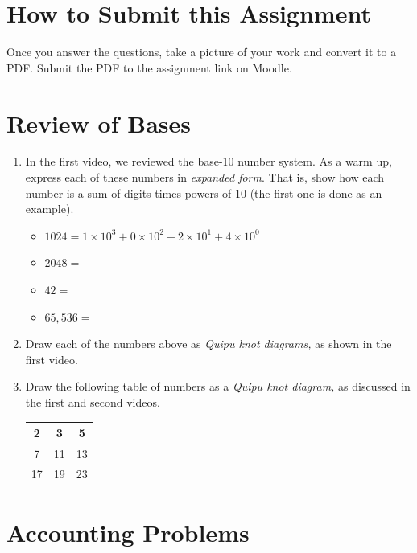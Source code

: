 \documentclass[10pt]{article}
\begin{document}
\maketitle

\section{How to Submit this Assignment}

Once you answer the questions, take a picture of your work and convert it to a PDF.  Submit the PDF to the assignment link on Moodle.

\section{Review of Bases}

\begin{enumerate}
\item In the first video, we reviewed the base-10 number system.  As a warm up, express each of these numbers in \textit{expanded form}.  That is, show how each number is a sum of digits times powers of 10 (the first one is done as an example).
\begin{itemize}
\item $1024 = 1 \times 10^3 + 0 \times 10^2 + 2 \times 10^1 + 4 \times 10^0$
\item $2048 = $
\item $42 = $
\item $65,536 = $
\end{itemize}
\item Draw each of the numbers above as \textit{Quipu knot diagrams,} as shown in the first video. \\ \vspace{4cm}
\item Draw the following table of numbers as a \textit{Quipu knot diagram,} as discussed in the first and second videos.
\begin{table}[hb]
\centering
\begin{tabular}{| c | c | c |}
\hline
2 & 3 & 5 \\ \hline
7 & 11 & 13 \\ \hline
17 & 19 & 23 \\ \hline
\end{tabular}
\end{table}
\end{enumerate}

\section{Accounting Problems}
\end{document}
